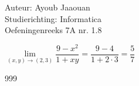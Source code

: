 \documentclass[a4paper]{article}
\newcommand{\llim}{\lim\limits}
\begin{document}
\noindent \large Auteur: Ayoub Jaaouan \\
\noindent \large Studierichting: Informatica\\
\noindent \large Oefeningenreeks 7A nr. 1.8\\
\medskip

\normalsize


$\llim_{(x,y) \rightarrow (2,3)} \dfrac{9-x^2}{1 + xy} = \dfrac{9-4}{1+2\cdot3} = \dfrac{5}{7}$\\

\begin{thebibliography}{999}
\end{thebibliography}
\end{document}

